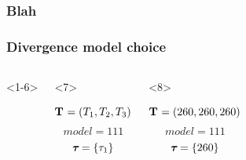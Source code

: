 
\begin{frame}
    \frametitle<1-6>{Blah}
    \frametitle<7->{Divergence model choice}
    \begin{columns}[c]
        \begin{onlyenv}<1-6>
            \begin{minipage}[c][0.5\textheight][c]{\linewidth}
            \end{minipage}
        \end{onlyenv}
        \begin{onlyenv}<7>
            \begin{minipage}[c][0.5\textheight][c]{\linewidth}
                \begin{displaybox}[0.95\linewidth]
                    \begin{minipage}[c][0.45\textheight][c]{0.95\linewidth}
                        \[
                            \mathbf{T_{}} = (T_{1},T_{2},T_{3})
                        \]\vspace{0mm}
                        \[
                            model = 111
                        \]\vspace{0mm}
                        \[
                            \boldsymbol{\tau_{}} = \{\tau_{1}\}
                        \]\vspace{0mm}
                    \end{minipage}
                \end{displaybox}
            \end{minipage}
        \end{onlyenv}
        \begin{onlyenv}<8>
            \begin{minipage}[c][0.5\textheight][c]{\linewidth}
                \begin{displaybox}[0.95\linewidth]
                    \begin{minipage}[c][0.45\textheight][c]{0.95\linewidth}
                        \[
                            \mathbf{T_{}} = (260,260,260)
                        \]\vspace{0mm}
                        \[
                            model = 111
                        \]\vspace{0mm}
                        \[
                            \boldsymbol{\tau_{}} = \{260\}
                        \]\vspace{0mm}

\end{minipage}
\end{displaybox}
\end{minipage}
\end{onlyenv}
\end{columns}
\end{frame}
